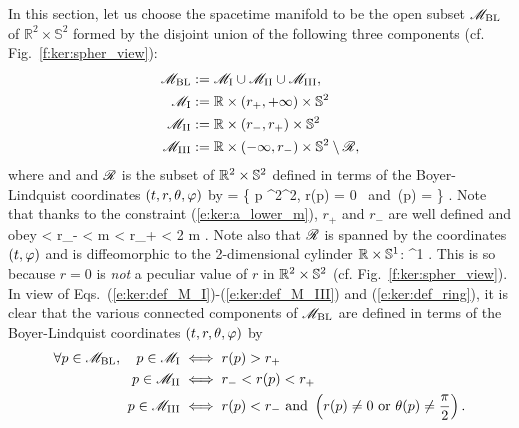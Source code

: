 In this section, let us choose the spacetime manifold to be the open subset $\mathscr{M}_{\rm BL}$
of $\mathbb{R}^2\times\mathbb{S}^2$ formed by the disjoint union of
the following three components (cf. Fig.~\ref{f:ker:spher_view}):
\begin{subequations}
\begin{align}
    \mathscr{M}_{\rm BL} & :=  \mathscr{M}_{\rm I} \cup \mathscr{M}_{\rm II} \cup \mathscr{M}_{\rm III} , \\
    \mathscr{M}_{\rm I} & :=  \mathbb{R}\times(r_+,+\infty)\times\mathbb{S}^2 \label{e:ker:def_M_I}\\
    \mathscr{M}_{\rm II} & :=  \mathbb{R}\times(r_-,r_+)\times\mathbb{S}^2 \\
    \mathscr{M}_{\rm III} & :=  \mathbb{R}\times(-\infty,r_-)\times\mathbb{S}^2 \setminus \mathscr{R}, \label{e:ker:def_M_III}
\end{align}
\end{subequations}
where
\be \label{e:ker:def_r_pm}
     \quad\mbox{and}\quad  {}
\ee
and $\mathscr{R}$ is the subset of $\mathbb{R}^2\times\mathbb{S}^2$ defined in terms of the Boyer-Lindquist coordinates $(t,r,\theta,\varphi)$ by
\be \label{e:ker:def_ring}
    \ring = \left\{ p \in \R^2\times\SS^2,
        \quad r(p) = 0 \ \mbox{and}\ \th(p) =  \right\} .
\ee
Note that thanks to the constraint (\ref{e:ker:a_lower_m}), $r_+$ and $r_-$
are well defined and obey
 < r_- < m < r_+ < 2 m .
\ee
Note also that $\mathscr{R}$ is spanned by the coordinates $(t,\varphi)$ and is diffeomorphic to the 2-dimensional cylinder $\mathbb{R}\times\mathbb{S}^1$:
\be \label{e:ker:ring_R_S1}
    \ring \simeq \R\times\SS^1 .
\ee
This is so because $r=0$ is \emph{not} a peculiar value of $r$ in $\mathbb{R}^2\times\mathbb{S}^2$
(cf. Fig.~\ref{f:ker:spher_view}).
In view of Eqs.~(\ref{e:ker:def_M_I})-(\ref{e:ker:def_M_III}) and (\ref{e:ker:def_ring}), it is clear that
the various connected components of $\mathscr{M}_{\rm BL}$ are defined in terms of the
Boyer-Lindquist coordinates $(t,r,\theta,\varphi)$ by
\begin{subequations}
\label{e:ker:M_I_III_r}
\begin{align}
  \forall p \in  \mathscr{M}_{\rm BL},\quad p \in \mathscr{M}_{\rm I} & \iff r(p) > r_+ \\
    \quad p \in \mathscr{M}_{\rm II} & \iff r_- < r(p) < r_+ \\
    \quad p \in \mathscr{M}_{\rm III} & \iff r(p) < r_-\ \mbox{and}\
    \left( r(p) \not=0 \ \mbox{or}\ \theta(p) \not=\frac{\pi}{2} \right) .
\end{align}
\end{subequations}


